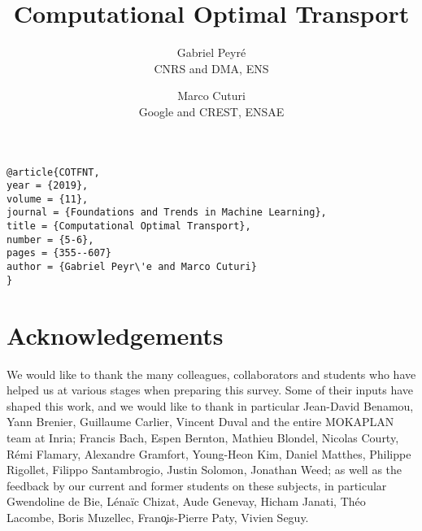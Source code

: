 \documentclass[openany]{now} %
\title{Computational Optimal Transport}
\author{%
Gabriel Peyr\'e\\CNRS and DMA, ENS
\and 
Marco Cuturi \\Google and CREST, ENSAE}}
\begin{document}
\maketitle

\begin{verbatim}@article{COTFNT,
year = {2019},
volume = {11},
journal = {Foundations and Trends in Machine Learning},
title = {Computational Optimal Transport},
number = {5-6},
pages = {355--607}
author = {Gabriel Peyr\'e and Marco Cuturi}
}\end{verbatim}

\tableofcontents

\mainmatter



%











\chapter*{Acknowledgements}
We would like to thank the many colleagues, collaborators and students who have helped us at various stages when preparing this survey. Some of their inputs have shaped this work, and we would like to thank in particular Jean-David Benamou, Yann Brenier, Guillaume Carlier, Vincent Duval and the entire MOKAPLAN team at Inria; Francis Bach, Espen Bernton, Mathieu Blondel, Nicolas Courty, R\'emi Flamary, Alexandre Gramfort, Young-Heon Kim, Daniel Matthes, Philippe Rigollet, Filippo Santambrogio, Justin Solomon, Jonathan Weed; as well as the feedback by our current and former students on these subjects, in particular Gwendoline de Bie, L\'ena\"ic Chizat, Aude Genevay, Hicham Janati, Th\'eo Lacombe, Boris Muzellec, Fran\c ois-Pierre Paty, Vivien Seguy.




\end{document}
